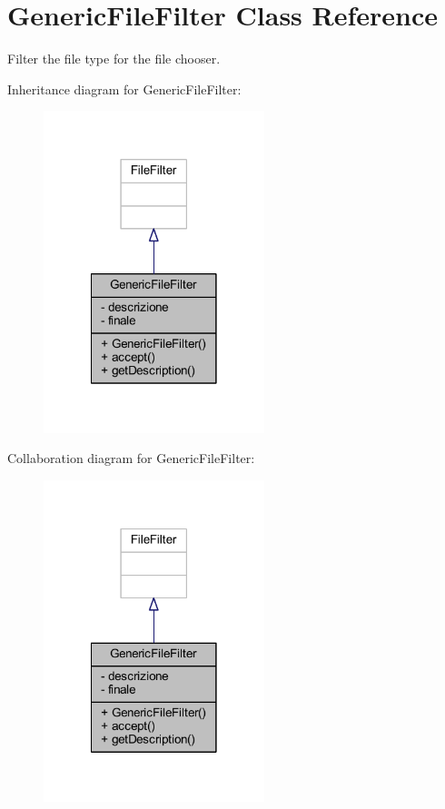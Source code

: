\hypertarget{class_generic_file_filter}{\section{Generic\-File\-Filter Class Reference}
\label{class_generic_file_filter}
}


Filter the file type for the file chooser.  




Inheritance diagram for Generic\-File\-Filter\-:
\nopagebreak
\begin{figure}[H]
\begin{center}
\leavevmode
\includegraphics[width=182pt]{class_generic_file_filter__inherit__graph}
\end{center}
\end{figure}


Collaboration diagram for Generic\-File\-Filter\-:
\nopagebreak
\begin{figure}[H]
\begin{center}
\leavevmode
\includegraphics[width=182pt]{class_generic_file_filter__coll__graph}
\end{center}
\end{figure}
